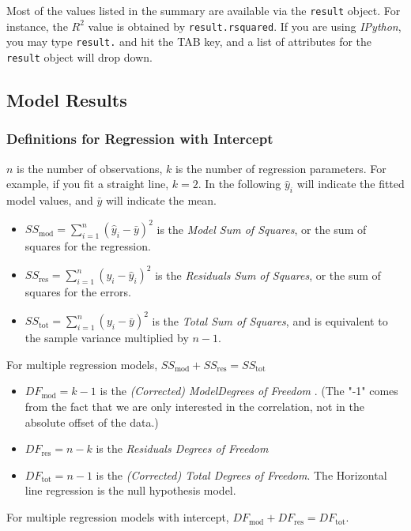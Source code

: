 Most of the values listed in the summary are available via the \texttt{result} object. For instance, the $R^2$ value is obtained by \lstinline{result.rsquared}. If you are using \emph{IPython}, you may type \lstinline{result.} and hit the TAB key, and a list of attributes for the \lstinline{result} object will drop down.

\subsection{Model Results}
\subsubsection{Definitions for Regression with Intercept}

$n$ is the number of observations, $k$ is the number of regression parameters. For example, if you fit a straight line, $k=2$.
In the following $\hat{y}_i$ will indicate the fitted model values, and $\bar{y}$ will indicate the mean.

\begin{itemize}
  \item $SS_\text{mod} = \sum_{i=1}^n (\hat{y}_i-\bar{y})^2$ is the \emph{Model Sum of Squares}, or the sum of squares for the regression.
  \item $SS_\text{res} = \sum_{i=1}^n (y_i-\hat{y}_i)^2$ is the \emph{Residuals Sum of Squares}, or the sum of squares for the errors.
  \item $SS_\text{tot} = \sum_{i=1}^n (y_i-\bar{y})^2$ is the \emph{Total Sum of Squares}, and is equivalent to the sample variance multiplied by $n-1$.
\end{itemize}

For multiple regression models, $SS_\text{mod} + SS_\text{res} = SS_\text{tot}$

\begin{itemize}
  \item $DF_\text{mod} = k - 1$ is the \emph{(Corrected) ModelDegrees of Freedom }. (The "-1" comes from the fact that we are only interested in the correlation, not in the absolute offset of the data.)
  \item $DF_\text{res} = n - k$ is the \emph{Residuals Degrees of Freedom}
  \item $DF_\text{tot} = n - 1$ is the \emph{(Corrected) Total Degrees of Freedom}. The Horizontal line regression is the null hypothesis model.
\end{itemize}

For multiple regression models with intercept, $DF_\text{mod} + DF_\text{res} = DF_\text{tot}$.

